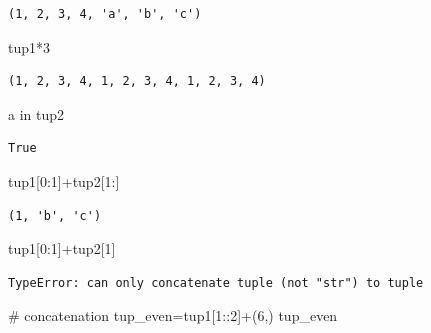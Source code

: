\documentclass[
  a4paper,
  DIV=11,
  numbers=noendperiod]{scrreprt}
\newenvironment{Shaded}{\begin{snugshade}}{\end{snugshade}}
\newcommand{\CommentTok}[1]{\textcolor[rgb]{0.37,0.37,0.37}{#1}}
\newcommand{\DecValTok}[1]{\textcolor[rgb]{0.68,0.00,0.00}{#1}}
\newcommand{\KeywordTok}[1]{\textcolor[rgb]{0.00,0.23,0.31}{#1}}
\newcommand{\NormalTok}[1]{\textcolor[rgb]{0.00,0.23,0.31}{#1}}
\newcommand{\OperatorTok}[1]{\textcolor[rgb]{0.37,0.37,0.37}{#1}}
\begin{document}
\begin{verbatim}
(1, 2, 3, 4, 'a', 'b', 'c')
\end{verbatim}

\begin{Shaded}
\begin{Highlighting}[]
\NormalTok{tup1}\OperatorTok{*}\DecValTok{3}
\end{Highlighting}
\end{Shaded}

\begin{verbatim}
(1, 2, 3, 4, 1, 2, 3, 4, 1, 2, 3, 4)
\end{verbatim}

\begin{Shaded}
\begin{Highlighting}[]
\CommentTok{\textquotesingle{}a\textquotesingle{}} \KeywordTok{in}\NormalTok{ tup2}
\end{Highlighting}
\end{Shaded}

\begin{verbatim}
True
\end{verbatim}

\begin{Shaded}
\begin{Highlighting}[]
\NormalTok{tup1[}\DecValTok{0}\NormalTok{:}\DecValTok{1}\NormalTok{]}\OperatorTok{+}\NormalTok{tup2[}\DecValTok{1}\NormalTok{:]}
\end{Highlighting}
\end{Shaded}

\begin{verbatim}
(1, 'b', 'c')
\end{verbatim}

\begin{Shaded}
\begin{Highlighting}[]
\NormalTok{tup1[}\DecValTok{0}\NormalTok{:}\DecValTok{1}\NormalTok{]}\OperatorTok{+}\NormalTok{tup2[}\DecValTok{1}\NormalTok{]}
\end{Highlighting}
\end{Shaded}

\begin{verbatim}
TypeError: can only concatenate tuple (not "str") to tuple
\end{verbatim}

\begin{Shaded}
\begin{Highlighting}[]
\CommentTok{\# concatenation}
\NormalTok{tup\_even}\OperatorTok{=}\NormalTok{tup1[}\DecValTok{1}\NormalTok{::}\DecValTok{2}\NormalTok{]}\OperatorTok{+}\NormalTok{(}\DecValTok{6}\NormalTok{,)}
\NormalTok{tup\_even}
\end{Highlighting}
\end{Shaded}
\end{document}
